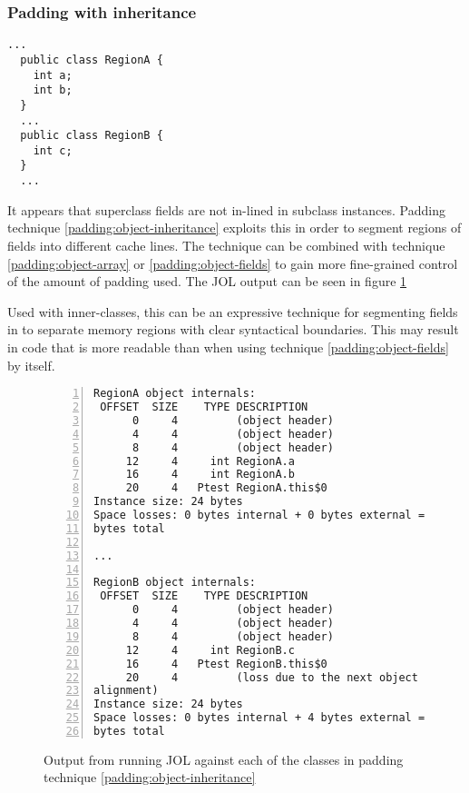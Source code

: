 \subsubsection{Padding with inheritance}

\begin{padding}[h]
\begin{Verbatim}[frame=single]
  ...
  public class RegionA {
    int a;
    int b;
  }
  ...
  public class RegionB {
    int c;
  }
  ...
\end{Verbatim}
	\caption{}
	\label{padding:object-inheritance}
\end{padding}

It appears that superclass fields are not in-lined in subclass instances.
Padding technique \ref{padding:object-inheritance} exploits this in order to
segment regions of fields into different cache lines. The technique can be
combined with technique \ref{padding:object-array} or
\ref{padding:object-fields} to gain more fine-grained control of the amount of
padding used. The JOL output can be seen in figure \ref{jol:object-inheritance}

Used with inner-classes, this can be an expressive technique for segmenting
fields in to separate memory regions with clear syntactical boundaries. This may
result in code that is more readable than when using technique
\ref{padding:object-fields} by itself.

\begin{figure}[h]
\begin{Verbatim}[frame=single, numbers=left]
RegionA object internals:
 OFFSET  SIZE    TYPE DESCRIPTION
      0     4         (object header)
      4     4         (object header)
      8     4         (object header)
     12     4     int RegionA.a
     16     4     int RegionA.b
     20     4   Ptest RegionA.this$0
Instance size: 24 bytes
Space losses: 0 bytes internal + 0 bytes external = 0
bytes total

...

RegionB object internals:
 OFFSET  SIZE    TYPE DESCRIPTION
      0     4         (object header)
      4     4         (object header)
      8     4         (object header)
     12     4     int RegionB.c
     16     4   Ptest RegionB.this$0
     20     4         (loss due to the next object
alignment)
Instance size: 24 bytes
Space losses: 0 bytes internal + 4 bytes external = 4
bytes total
\end{Verbatim}
	\caption{Output from running JOL against each of the classes in padding
	technique \ref{padding:object-inheritance}}
	\label{jol:object-inheritance}
\end{figure}

